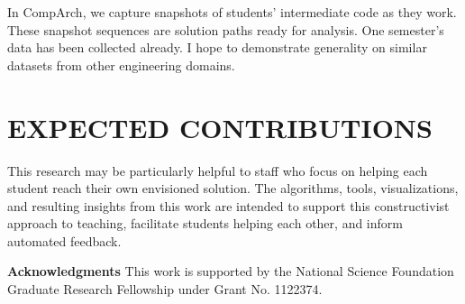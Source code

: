 \documentclass{sig-alternate-2013}
\begin{document}
In CompArch, we capture snapshots of students' intermediate code as they work. These snapshot sequences are solution paths ready for analysis. One semester's data has been collected already. I hope to demonstrate generality on similar datasets from other engineering domains.

\section{EXPECTED CONTRIBUTIONS}

This research may be particularly helpful to staff who focus on helping each student reach their own envisioned solution. The algorithms, tools, visualizations, and resulting insights from this work are intended to support this constructivist approach to teaching, facilitate students helping each other, and inform automated feedback.

\textbf{Acknowledgments}
This work is supported by the National Science Foundation Graduate Research Fellowship under Grant No. 1122374.




%
\end{document}

